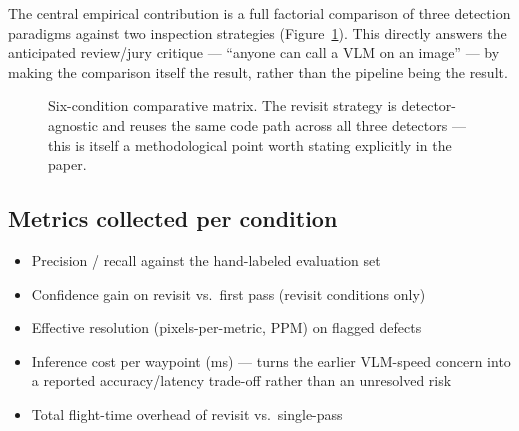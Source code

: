 \documentclass[11pt,a4paper]{article}
\begin{document}
The central empirical contribution is a full factorial comparison of three detection paradigms against two inspection strategies (Figure~\ref{fig:matrix}). This directly answers the anticipated review/jury critique --- ``anyone can call a VLM on an image'' --- by making the comparison itself the result, rather than the pipeline being the result.

\begin{figure}[h!]
\centering
{}
\caption{Six-condition comparative matrix. The revisit strategy is detector-agnostic and reuses the same code path across all three detectors --- this is itself a methodological point worth stating explicitly in the paper.}
\label{fig:matrix}
\end{figure}

\subsection{Metrics collected per condition}
\begin{itemize}
    \item Precision / recall against the hand-labeled evaluation set
    \item Confidence gain on revisit vs.\ first pass (revisit conditions only)
    \item Effective resolution (pixels-per-metric, PPM) on flagged defects
    \item Inference cost per waypoint (ms) --- turns the earlier VLM-speed concern into a reported accuracy/latency trade-off rather than an unresolved risk
    \item Total flight-time overhead of revisit vs.\ single-pass
\end{itemize}
\end{document}
